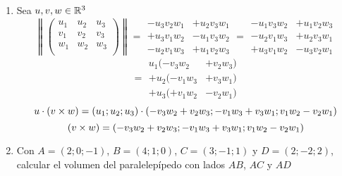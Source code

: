 \documentclass[../practica.root.tex]{subfiles}
\begin{document}
\begin{enumerate}
    \item Sea $u,v,w \in \mathbb{R}^3$
          \[
              \left\|
              \begin{pmatrix}
                  u_1 & u_2 & u_3 \\
                  v_1 & v_2 & v_3 \\
                  w_1 & w_2 & w_3 \\
              \end{pmatrix}
              \right\|
              =
              \begin{array}{rl}
                  -u_3 v_2 w_1  & + u_2 v_3 w_1 \\
                  + u_3 v_1 w_2 & - u_1 v_3 w_2 \\
                  - u_2 v_1 w_3 & + u_1 v_2 w_3
              \end{array}
              =
              \begin{array}{rl}
                  - u_1 v_3 w_2 & + u_1 v_2 w_3 \\
                  - u_2 v_1 w_3 & + u_2 v_3 w_1 \\
                  + u_3 v_1 w_2 & -u_3 v_2 w_1
              \end{array}
          \] \[
              =
              \begin{array}{rl}
                  u_1(- v_3 w_2   & + v_2 w_3) \\
                  + u_2(- v_1 w_3 & + v_3 w_1) \\
                  + u_3(+ v_1 w_2 & -v_2 w_1)
              \end{array}
          \] \[
              u \cdot (v \times w) = (u_1; u_2; u_3) \cdot (-v_3w_2+v_2w_3; -v_1w_3+v_3w_1; v_1w_2-v_2w_1)
          \] \[
              (v \times w) = (-v_3w_2+v_2w_3; -v_1w_3+v_3w_1; v_1w_2-v_2w_1)
          \]

    \item Con $A = (2; 0; -1)$, $B = (4; 1; 0)$, $C = (3; -1; 1)$ y $D = (2; -2; 2)$,
          calcular el volumen del paralelepípedo con lados $AB$, $AC$ y $AD$

\end{enumerate}
\end{document}
